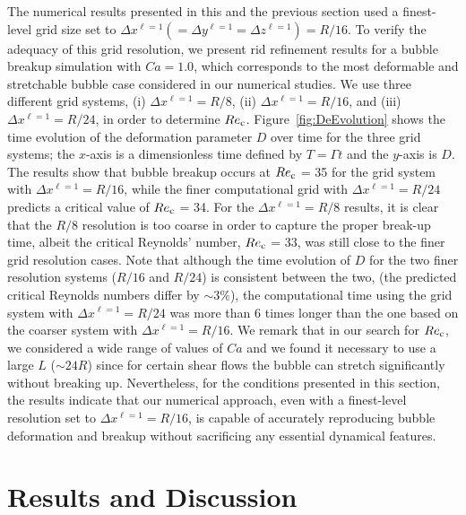 \documentclass{elsarticle}
\begin{document}
The numerical results presented in this and the previous section used a
finest-level grid size set to $\Delta x^{\ell=1}(= \Delta y^{\ell=1}= \Delta
z^{\ell=1})=R/16$. To verify the adequacy of this grid resolution, we present
rid refinement results for a bubble breakup simulation with $Ca=1.0$, which
corresponds to the most deformable and stretchable bubble case considered in
our numerical studies. We use three different grid systems, (i) $\Delta
x^{\ell=1}=R/8$, (ii) $\Delta x^{\ell=1}=R/16$, and (iii) $\Delta
x^{\ell=1}=R/24$, in order to determine $Re_{\rm c}$.
Figure~\ref{fig:DeEvolution} shows the time evolution of the deformation
parameter $D$ over time for the three grid systems; the $x$-axis is a
dimensionless time defined by $T=\mathit{\Gamma} t$ and the $y$-axis is $D$.
The results show that bubble breakup occurs at $Re_{\rm c}$ = 35 for the grid
system with $\Delta x^{\ell=1}=R/16$, while the finer computational grid with
$\Delta x^{\ell=1}=R/24$ predicts a critical value of $Re_{\rm c}$ = 34.  For
the $\Delta x^{\ell=1}=R/8$ results, it is clear that the $R/8$ resolution is
too coarse in order to capture the proper break-up time, albeit the critical
Reynolds' number, $Re_{\rm c}$ = 33, was still close to the finer grid
resolution cases.  Note that although the time evolution of $D$ for the two
finer resolution systems ($R/16$ and $R/24$) is consistent between the two,
(the predicted critical Reynolds numbers differ by $\sim 3\%$), the
computational time using the grid system with $\Delta x^{\ell=1}=R/24$ was more
than 6 times longer than the one based on the coarser system with $\Delta
x^{\ell=1}=R/16$.  We remark that in our search for $Re_{\rm c}$, we considered
a wide range of values of $Ca$ and we found it necessary to use a large $L$
($\sim 24R$) since for certain shear flows the bubble can stretch significantly
without breaking up.  Nevertheless, for the conditions presented in this
section, the results indicate that our numerical approach, even with a
finest-level resolution set to $\Delta x^{\ell=1}=R/16$, is capable of
accurately reproducing bubble deformation and breakup without sacrificing any
essential dynamical features.

\section{Results and Discussion}
\end{document}
